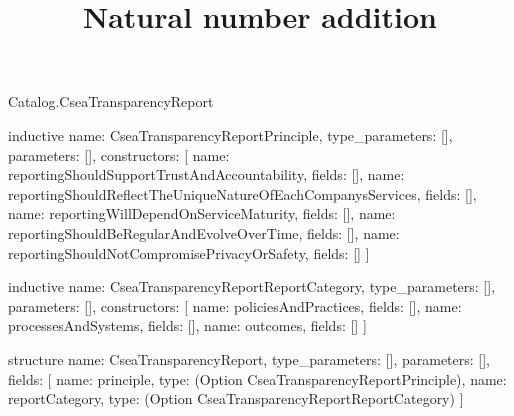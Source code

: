 \begin{lexlean}{Catalog.CseaTransparencyReport}
\title{Natural number addition}
\begin{semanticmodule}
inductive{
  name: CseaTransparencyReportPrinciple,
  type_parameters: [],
  parameters: [],
  constructors: [
    {name: reportingShouldSupportTrustAndAccountability, fields: []},
    {name: reportingShouldReflectTheUniqueNatureOfEachCompanysServices, fields: []},
    {name: reportingWillDependOnServiceMaturity, fields: []},
    {name: reportingShouldBeRegularAndEvolveOverTime, fields: []},
    {name: reportingShouldNotCompromisePrivacyOrSafety, fields: []}
  ]
}

inductive{
  name: CseaTransparencyReportReportCategory,
  type_parameters: [],
  parameters: [],
  constructors: [
    {name: policiesAndPractices, fields: []},
    {name: processesAndSystems, fields: []},
    {name: outcomes, fields: []}
  ]
}

structure{
  name: CseaTransparencyReport,
  type_parameters: [],
  parameters: [],
  fields: [
    {name: principle, type: (Option CseaTransparencyReportPrinciple)},
    {name: reportCategory, type: (Option CseaTransparencyReportReportCategory)}
  ]
}
\end{semanticmodule}
\end{lexlean}
